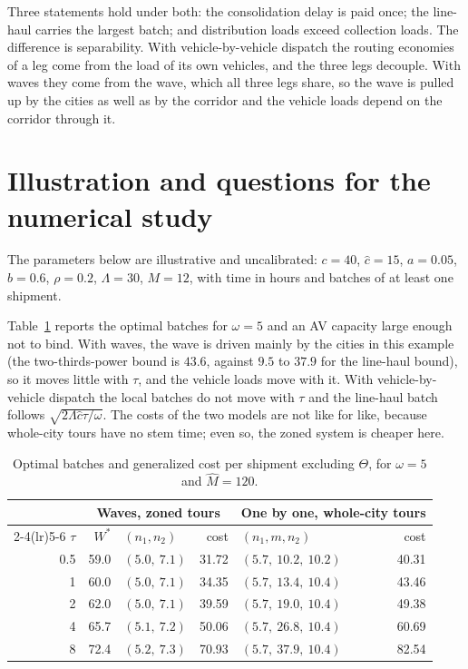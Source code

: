 \documentclass[10pt, reqno]{amsart}
\theoremstyle{definition}
\begin{document}
Three statements hold under both: the consolidation delay is paid once; the line-haul carries the largest batch; and distribution loads exceed collection loads. The difference is separability. With vehicle-by-vehicle dispatch the routing economies of a leg come from the load of its own vehicles, and the three legs decouple. With waves they come from the wave, which all three legs share, so the wave is pulled up by the cities as well as by the corridor and the vehicle loads depend on the corridor through it.

\section{Illustration and questions for the numerical study}

The parameters below are illustrative and uncalibrated: $c=40$, $\hat c=15$, $a=0.05$, $b=0.6$, $\rho=0.2$, $\Lambda=30$, $M=12$, with time in hours and batches of at least one shipment.

Table~\ref{tab:zoned} reports the optimal batches for $\omega=5$ and an AV capacity large enough not to bind. With waves, the wave is driven mainly by the cities in this example (the two-thirds-power bound is $43.6$, against $9.5$ to $37.9$ for the line-haul bound), so it moves little with $\tau$, and the vehicle loads move with it. With vehicle-by-vehicle dispatch the local batches do not move with $\tau$ and the line-haul batch follows $\sqrt{2\Lambda\hat c\tau/\omega}$. The costs of the two models are not like for like, because whole-city tours have no stem time; even so, the zoned system is cheaper here.

\begin{table}[h]
\centering
\caption{Optimal batches and generalized cost per shipment excluding $\Theta$, for $\omega=5$ and $\hat M=120$.}\label{tab:zoned}
\begin{tabular}{rrlrlr}
\toprule
 & \multicolumn{3}{c}{Waves, zoned tours} & \multicolumn{2}{c}{One by one, whole-city tours}\\
\cmidrule(lr){2-4}\cmidrule(lr){5-6}
$\tau$ & $W^*$ & $(n_1,n_2)$ & cost & $(n_1,m,n_2)$ & cost\\
\midrule
0.5 & 59.0 & $(5.0,\ 7.1)$ & 31.72 & $(5.7,\ 10.2,\ 10.2)$ & 40.31\\
1 & 60.0 & $(5.0,\ 7.1)$ & 34.35 & $(5.7,\ 13.4,\ 10.4)$ & 43.46\\
2 & 62.0 & $(5.0,\ 7.1)$ & 39.59 & $(5.7,\ 19.0,\ 10.4)$ & 49.38\\
4 & 65.7 & $(5.1,\ 7.2)$ & 50.06 & $(5.7,\ 26.8,\ 10.4)$ & 60.69\\
8 & 72.4 & $(5.2,\ 7.3)$ & 70.93 & $(5.7,\ 37.9,\ 10.4)$ & 82.54\\
\bottomrule
\end{tabular}
\end{table}
\end{document}
